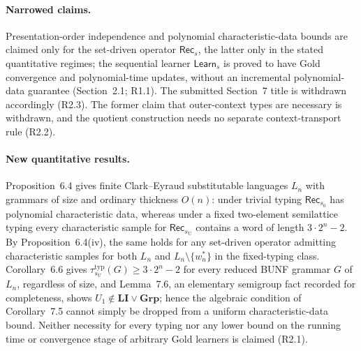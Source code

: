 \documentclass[
  10pt,
  a4paper,
]{article}
\begin{document}
\paragraph{Narrowed claims.}
Presentation-order independence and polynomial characteristic-data
bounds are claimed only for the set-driven operator $\mathsf{Rec}_s$, the
latter only in the stated quantitative regimes; the sequential learner
$\mathsf{Learn}_s$ is proved to have Gold convergence and
polynomial-time updates, without an incremental polynomial-data guarantee
(Section~2.1; R1.1). The submitted Section~7 title is withdrawn
accordingly (R2.3). The former claim that outer-context types are
necessary is withdrawn, and the quotient construction needs no separate
context-transport rule (R2.2).

\paragraph{New quantitative results.}
Proposition~6.4 gives finite Clark--Eyraud substitutable languages $L_n$
with grammars of size and ordinary thickness $O(n)$: under trivial typing
$\mathsf{Rec}_{s_0}$ has polynomial characteristic data, whereas under a
fixed two-element semilattice typing every characteristic sample for
$\mathsf{Rec}_{s_{\mathrm U}}$ contains a word of length $3\cdot2^n-2$.
By Proposition~6.4(iv), the same holds for any set-driven operator
admitting characteristic samples for both $L_n$ and
$L_n\setminus\{w_n^*\}$ in the fixed-typing class. Corollary~6.6 gives
$\tau_{s_{\mathrm U}}^{\mathrm{typ}}(G)\ge3\cdot2^n-2$ for every reduced
BUNF grammar $G$ of $L_n$, regardless of size, and Lemma~7.6, an
elementary semigroup fact recorded for completeness, shows
$U_1\notin\mathbf{LI}\vee\mathbf{Grp}$; hence the algebraic condition of
Corollary~7.5 cannot simply be dropped from a uniform characteristic-data
bound. Neither necessity for every typing nor any lower bound on the
running time or convergence stage of arbitrary Gold learners is claimed
(R2.1).
\end{document}
